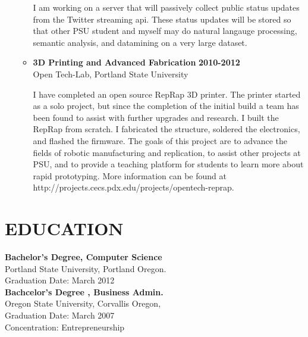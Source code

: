 \documentclass[overlapped]{res}
\begin{document}
\begin{resume}
\begin{itemize}[leftmargin=0in]
\begin{itemize}[leftmargin=0in]
\begin{samepage}
                    I am working on a server that will passively collect public status updates from the
                    Twitter streaming api. These status updates will be stored so that other PSU student
                    and myself may do natural langauge processing, semantic analysis, and datamining on
                    a very large dataset.				
                \end{samepage}

            \item[] 
                \begin{samepage}

                    \textbf{3D Printing and Advanced Fabrication} \hfill \textbf{2010-2012} \\
                    Open Tech-Lab, Portland State University

                    I have completed an open source RepRap 3D printer. The printer started as a solo project, 
                    but since the completion of the initial build a team has been found to assist with further 
                    upgrades and research. I built the RepRap from scratch. I fabricated the structure, soldered  
                    the electronics, and flashed the firmware. 	The goals of this project are to advance the 
                    fields of robotic manufacturing and replication, to assist other projects at PSU, and to 
                    provide a teaching platform for students to learn more about rapid prototyping. 
                    More information can be found at http://projects.cecs.pdx.edu/projects/opentech-reprap. 
                \end{samepage}
        \end{itemize}
\end{itemize}
	
\section{EDUCATION} 
\begin{multicols}{2}
    \textbf{Bachelor's Degree, Computer Science} \\
    Portland State University, Portland Oregon. \\
    Graduation Date: March 2012 \\

    \columnbreak
    \textbf{Bachcelor's Degree , Business Admin.} \\
    Oregon State University, Corvallis Oregon, \\
    Graduation Date: March 2007 \\
    Concentration: Entrepreneurship
\end{multicols}


\end{resume}
\end{document}
